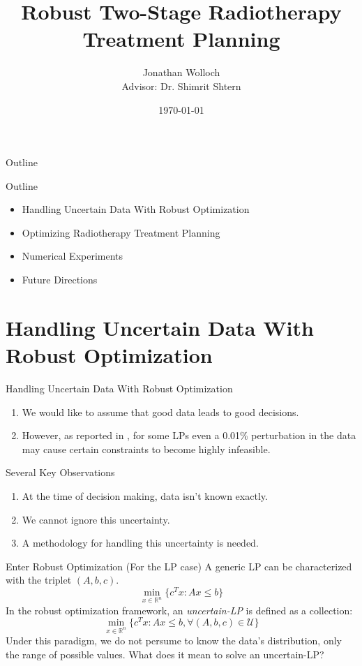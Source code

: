 \documentclass[11pt]{beamer}
\title[Robust Two-Stage RTP]{Robust Two-Stage Radiotherapy Treatment Planning}
\author[Jonathan Wolloch]{Jonathan Wolloch\\Advisor: Dr. Shimrit Shtern}
\institute[Technion]{Faculty of Data and Decision Sciences\\Technion - Israel Institute of Technology}
\date{\today}
\begin{document}
\begin{frame}[plain]
  \titlepage
\end{frame}

\begin{frame}{Outline}
  \tableofcontents
\end{frame}

\begin{frame}{Outline}
  \begin{itemize}
    \item Handling Uncertain Data With Robust Optimization
    \item Optimizing Radiotherapy Treatment Planning
    \item Numerical Experiments
    \item Future Directions
  \end{itemize}
\end{frame}

\section{Handling Uncertain Data With Robust Optimization}
\begin{frame}{Handling Uncertain Data With Robust Optimization}
  \begin{enumerate}
    \setlength{\itemsep}{1em}
    \item We would like to assume that good data leads to good decisions.
    \item However, as reported in \cite{ben-tal2000}, for some LPs even a 0.01\% perturbation in the data may cause certain constraints to become highly infeasible.
  \end{enumerate}
\end{frame}

\begin{frame}{Several Key Observations}
    \begin{enumerate}
        \setlength{\itemsep}{1em}
      \item At the time of decision making, data isn't known exactly.
      \item We cannot ignore this uncertainty.
      \item A methodology for handling this uncertainty is needed.
    \end{enumerate}
  \end{frame}

  \begin{frame}{Enter Robust Optimization (For the LP case)}
A generic LP can be characterized with the triplet $(A, b, c)$.
      \[
        \min_{x \in \mathbb{R}^n} \{c^T x : Ax \leq b\}
      \]
In the robust optimization framework, an \textit{uncertain-LP} is defined as a collection:
      \[
        \min_{x \in \mathbb{R}^n} \{c^T x : Ax \leq b, \forall (A, b, c) \in \mathcal{U}\}
      \]
Under this paradigm, we do not persume to know the data's distribution, only the range of possible values.
What does it mean to solve an uncertain-LP?


  \end{frame}
  
\end{document}
